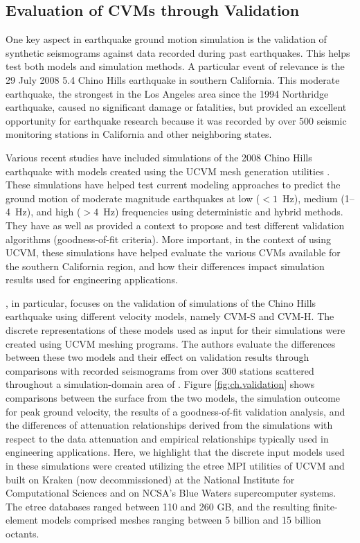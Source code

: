 
\subsection{Evaluation of CVMs through Validation}

One key aspect in earthquake ground motion simulation is the validation of synthetic seismograms against data recorded during past earthquakes. This helps test both models and simulation methods. A particular event of relevance is the 29 July 2008  5.4 Chino Hills earthquake in southern California. This moderate earthquake, the strongest in the Los Angeles area since the 1994 Northridge earthquake, caused no significant damage or fatalities, but provided an excellent opportunity for earthquake research because it was recorded by over 500 seismic monitoring stations in California and other neighboring states. 

Various recent studies have included simulations of the 2008 Chino Hills earthquake with models created using the UCVM mesh generation utilities \citep[e.g.,][]{Olsen_2010_SRL, Taborda_2013_BSSA, Taborda_2014_BSSA}. These simulations have helped test current modeling approaches to predict the ground motion of moderate magnitude earthquakes at low ($<1$~Hz), medium (1--4~Hz), and high ($>4$~Hz) frequencies using deterministic and hybrid methods. They have as well as provided a context to propose and test different validation algorithms (goodness-of-fit criteria). More important, in the context of using UCVM, these simulations have helped evaluate the various CVMs available for the southern California region, and how their differences impact simulation results used for engineering applications.

\citet{Taborda_2014_BSSA}, in particular, focuses on the validation of simulations of the Chino Hills earthquake using different velocity models, namely CVM-S and CVM-H. The discrete representations of these models used as input for their simulations were created using UCVM meshing programs. The authors evaluate the differences between these two models and their effect on validation results through comparisons with recorded seismograms from over 300 stations scattered throughout a simulation-domain area of . Figure \ref{fig:ch.validation} shows comparisons between the surface \vs{} from the two models, the simulation outcome for peak ground velocity, the results of a goodness-of-fit validation analysis, and the differences of attenuation relationships derived from the simulations with respect to the data attenuation and empirical relationships typically used in engineering applications. Here, we highlight that the discrete input models used in these simulations were created utilizing the etree MPI utilities of UCVM and built on Kraken (now decommissioned) at the National Institute for Computational Sciences and on NCSA's Blue Waters supercomputer systems. The etree databases ranged between 110 and 260 GB, and the resulting finite-element models comprised meshes ranging between 5 billion and 15 billion octants.

